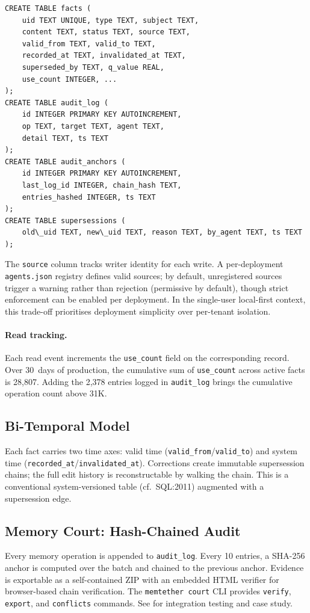 \documentclass[sigconf,nonacm]{acmart}
\begin{document}
\begin{verbatim}
CREATE TABLE facts (
    uid TEXT UNIQUE, type TEXT, subject TEXT,
    content TEXT, status TEXT, source TEXT,
    valid_from TEXT, valid_to TEXT,
    recorded_at TEXT, invalidated_at TEXT,
    superseded_by TEXT, q_value REAL,
    use_count INTEGER, ...
);
CREATE TABLE audit_log (
    id INTEGER PRIMARY KEY AUTOINCREMENT,
    op TEXT, target TEXT, agent TEXT,
    detail TEXT, ts TEXT
);
CREATE TABLE audit_anchors (
    id INTEGER PRIMARY KEY AUTOINCREMENT,
    last_log_id INTEGER, chain_hash TEXT,
    entries_hashed INTEGER, ts TEXT
);
CREATE TABLE supersessions (
    old\_uid TEXT, new\_uid TEXT, reason TEXT, by_agent TEXT, ts TEXT
);
\end{verbatim}

The \texttt{source} column tracks writer identity for each write. A per-deployment \texttt{agents.json} registry defines valid sources; by default, unregistered sources trigger a warning rather than rejection (permissive by default), though strict enforcement can be enabled per deployment. In the single-user local-first context, this trade-off prioritises deployment simplicity over per-tenant isolation.

\paragraph{Read tracking.}
Each read event increments the \texttt{use\_count} field on the corresponding record. Over 30~days of production, the cumulative sum of \texttt{use\_count} across active facts is 28{,}807. Adding the 2{,}378 entries logged in \texttt{audit\_log} brings the cumulative operation count above 31K.

\subsection{Bi-Temporal Model}
Each fact carries two time axes: valid time (\texttt{valid\_from}/\texttt{valid\_to}) and system time (\texttt{recorded\_at}/\texttt{invalidated\_at}). Corrections create immutable supersession chains; the full edit history is reconstructable by walking the chain. This is a conventional system-versioned table (cf.\ SQL:2011) augmented with a supersession edge.

\subsection{Memory Court: Hash-Chained Audit}
Every memory operation is appended to \texttt{audit\_log}. Every 10 entries, a SHA-256 anchor is computed over the batch and chained to the previous anchor. Evidence is exportable as a self-contained ZIP with an embedded HTML verifier for browser-based chain verification. The \texttt{memtether court} CLI provides \texttt{verify}, \texttt{export}, and \texttt{conflicts} commands. See \cite{companionjss} for integration testing and case study.
\end{document}
